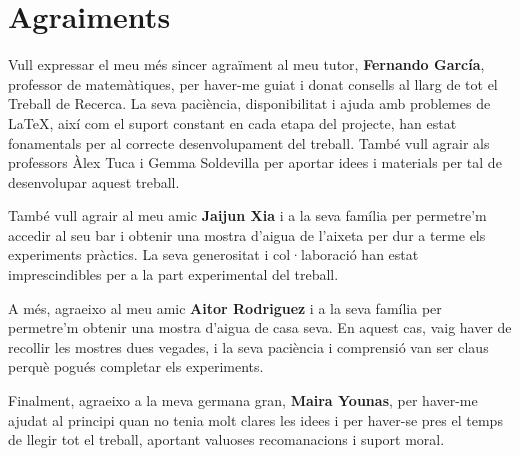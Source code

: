 \chapter*{Agraiments}
Vull expressar el meu més sincer agraïment al meu tutor, \textbf{Fernando García}, professor de matemàtiques, per haver-me guiat i donat consells al llarg de tot el Treball de Recerca. La seva paciència, disponibilitat i ajuda amb problemes de LaTeX, així com el suport constant en cada etapa del projecte, han estat fonamentals per al correcte desenvolupament del treball. També vull agrair als professors Àlex Tuca i Gemma Soldevilla per aportar idees i materials per tal de  desenvolupar aquest treball.

També vull agrair al meu amic \textbf{Jaijun Xia} i a la seva família per permetre'm accedir al seu bar i obtenir una mostra d’aigua de l'aixeta per dur a terme els experiments pràctics. La seva generositat i col·laboració han estat imprescindibles per a la part experimental del treball.

A més, agraeixo al meu amic \textbf{Aitor Rodriguez} i a la seva família per permetre'm obtenir una mostra d’aigua de casa seva. En aquest cas, vaig haver de recollir les mostres dues vegades, i la seva paciència i comprensió van ser claus perquè pogués completar els experiments.

Finalment, agraeixo a la meva germana gran, \textbf{Maira Younas}, per haver-me ajudat al principi quan no tenia molt clares les idees i per haver-se pres el temps de llegir tot el treball, aportant valuoses recomanacions i suport moral.
